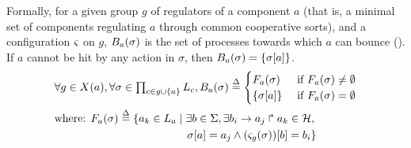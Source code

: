 Formally, for a given group $g$ of regulators of a component $a$
(that is, a minimal set of components regulating $a$ through common cooperative sorts),
and a configuration $\varsigma$ on $g$,
$B_a(\sigma)$ is the set of processes towards which $a$ can bounce ().
If $a$ cannot be hit by any action in $\sigma$, then $B_a(\sigma) = \{ {\sigma[a]} \}$.
%
\begin{align}
\begin{split}\label{eq:possible-bounces}
  &\forall g \in X(a), \forall \sigma \in \textstyle\prod_{c\in g \cup \{ a \}} L_c,
  B_a(\sigma) \stackrel{\Delta}= 
  \begin{cases}
    F_a(\sigma)
      & \text{ if } F_a(\sigma) \neq \emptyset\\
    \{ {\sigma[a]} \}
      & \text{ if } F_a(\sigma) = \emptyset
  \end{cases}\\
  &\text{where: } F_a(\sigma) \stackrel{\Delta}= \{ a_k \in L_a \mid \exists b \in \Sigma, \exists b_i\rightarrow a_j\Rsh a_k \in \mathcal{H},\\
  & \qquad\qquad\qquad\qquad\qquad\qquad {\sigma[a]} = a_j \wedge {(\varsigma_{g}(\sigma))[b]} = b_i \}\\
\end{split}
\end{align}

